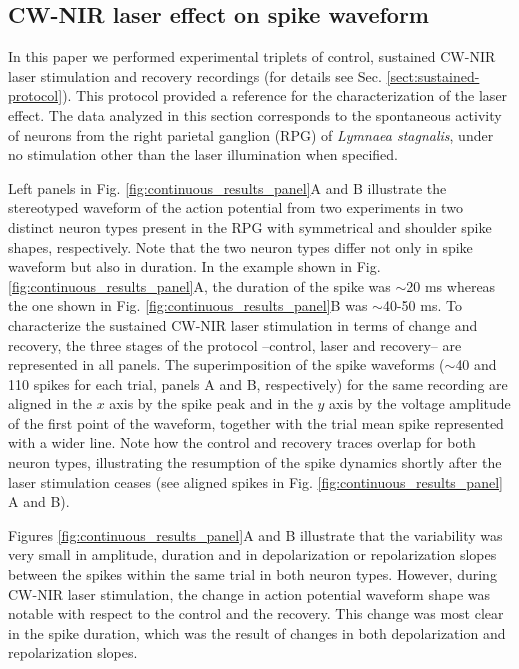 
\subsection{CW-NIR laser effect on spike waveform}
In this paper we performed experimental triplets of control, sustained CW-NIR laser stimulation and recovery recordings (for details see Sec. \ref{sect:sustained-protocol}). This protocol provided a reference for the characterization of the laser effect. The data analyzed in this section corresponds to the spontaneous activity of neurons from the right parietal ganglion (RPG) of \textit{Lymnaea stagnalis}, under no stimulation other than the laser illumination when specified.

Left panels in Fig. \ref{fig:continuous_results_panel}A and B illustrate the stereotyped waveform of the action potential from two experiments in two distinct neuron types present in the RPG with symmetrical and shoulder spike shapes, respectively. Note that the two neuron types differ not only in spike waveform but also in duration. In the example shown in Fig. \ref{fig:continuous_results_panel}A, the duration of the spike was $\sim$20 ms whereas the one shown in Fig. \ref{fig:continuous_results_panel}B was $\sim$40-50 ms. To characterize the sustained CW-NIR laser stimulation in terms of change and recovery, the three stages of the protocol --control, laser and recovery-- are represented in all panels. The superimposition of the spike waveforms ($\sim$40 and 110 spikes for each trial, panels A and B, respectively) for the same recording are aligned in the $x$ axis by the spike peak and in the $y$ axis by the voltage amplitude of the first point of the waveform, together with the trial mean spike represented with a wider line. Note how the control and recovery traces overlap for both neuron types, illustrating the resumption of the spike dynamics shortly after the laser stimulation ceases (see aligned spikes in Fig. \ref{fig:continuous_results_panel} A and B).

Figures \ref{fig:continuous_results_panel}A and B illustrate that the variability was very small in amplitude, duration and in depolarization or repolarization slopes between the spikes within the same trial in both neuron types. However, during CW-NIR laser stimulation, the change in action potential waveform shape was notable with respect to the control and the recovery. This change was most clear in the spike duration, which was the result of changes in both depolarization and repolarization slopes. 

